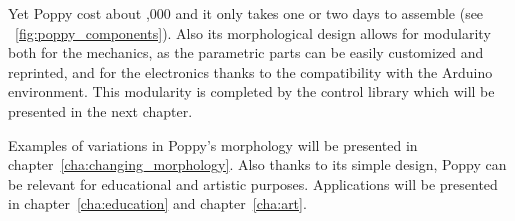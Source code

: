 Yet Poppy cost about ,000 and it only takes one or two days to assemble (see \figurename~\ref{fig:poppy_components}). Also its morphological design allows for modularity both for the mechanics, as the parametric parts can be easily customized and reprinted, and for the electronics thanks to the compatibility with the Arduino environment. This modularity is completed by the control library which will be presented in the next chapter.

Examples of variations in Poppy’s morphology will be presented in chapter~\ref{cha:changing_morphology}. Also thanks to its simple design, Poppy can be relevant for educational and artistic purposes. Applications will be presented in chapter~\ref{cha:education} and chapter~\ref{cha:art}.














